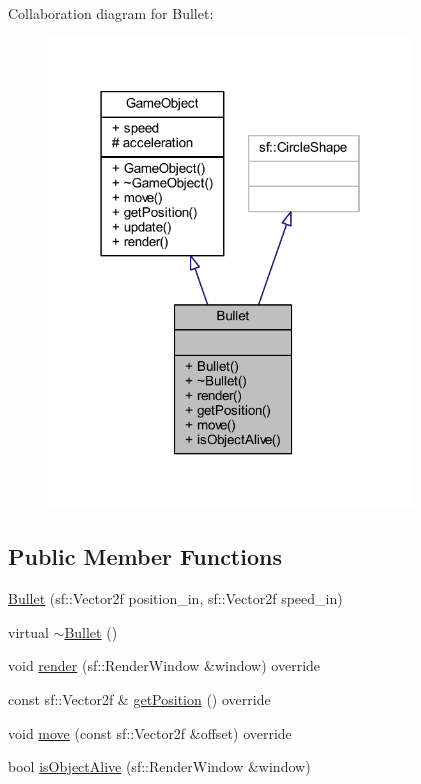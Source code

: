 Collaboration diagram for Bullet\+:
\nopagebreak
\begin{figure}[H]
\begin{center}
\leavevmode
\includegraphics[width=274pt]{class_bullet__coll__graph}
\end{center}
\end{figure}
\subsection*{Public Member Functions}
\begin{DoxyCompactItemize}
\item 
\hyperlink{class_bullet_ab785558b82bce3c860a9d0f63aff2f41}{Bullet} (sf\+::\+Vector2f position\+\_\+in, sf\+::\+Vector2f speed\+\_\+in)
\item 
virtual \hyperlink{class_bullet_aaeb5cb41d7db89f49007b08b41f1bfcf}{$\sim$\+Bullet} ()
\item 
void \hyperlink{class_bullet_ae4af350647e1b2a798eb3fd35a883b84}{render} (sf\+::\+Render\+Window \&window) override
\item 
const sf\+::\+Vector2f \& \hyperlink{class_bullet_a82f82d6367d1c403898a29d1ce91630d}{get\+Position} () override
\item 
void \hyperlink{class_bullet_a8715ab2edff76c8b45fabc6dc453e85d}{move} (const sf\+::\+Vector2f \&offset) override
\item 
bool \hyperlink{class_bullet_a23cadfbb18a562482f0bae03f0edd029}{is\+Object\+Alive} (sf\+::\+Render\+Window \&window)
\end{DoxyCompactItemize}
